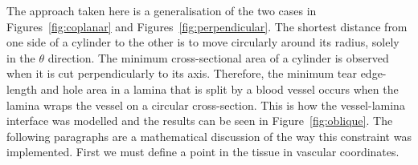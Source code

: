   The approach taken here is a generalisation of the two cases in Figures~\ref{fig:coplanar} and Figures~\ref{fig:perpendicular}. The shortest distance from one side of a cylinder to the other is to move circularly around its radius, solely in the $\theta$ direction. The minimum cross-sectional area of a cylinder is observed when it is cut perpendicularly to its axis. Therefore, the minimum tear edge-length and hole area in a lamina that is split by a blood vessel occurs when the lamina wraps the vessel on a circular cross-section. This is how the vessel-lamina interface was modelled and the results can be seen in Figure~\ref{fig:oblique}. The following paragraphs are a mathematical discussion of the way this constraint was implemented. First we must define a point in the tissue in vascular coordinates.
  
  \begin{figure}[htbp]
    \centering
     \qquad
     \qquad

\end{figure}
